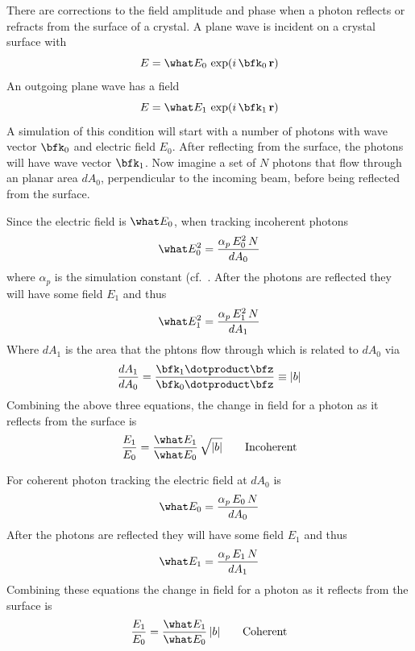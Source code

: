 There are corrections to the field amplitude and phase when a photon reflects or refracts from the
surface of a crystal. A plane wave is incident on a crystal surface with
\begin{equation}
  E = \what E_0 \, \exp(i \, \bfk_0 \, \bfr)
\end{equation}
An outgoing plane wave has a field
\begin{equation}
  E = \what E_1 \, \exp(i \, \bfk_1 \, \bfr)
\end{equation}
A simulation of this condition will start with a number of photons with wave vector $\bfk_0$ and
electric field $E_0$. After reflecting from the surface, the photons will have wave vector
$\bfk_1$. Now imagine a set of $N$ photons that flow through an planar area $dA_0$, perpendicular to
the incoming beam, before being reflected from the surface.

Since the electric field is $\what E_0$, when tracking incoherent photons
\begin{equation}
  \what E_0^2 = \frac{\alpha_p \, E_0^2 \, N}{dA_0}
\end{equation}
where $\alpha_p$ is the simulation constant (cf.~. 
After the photons are reflected they will have some field $E_1$ and thus
\begin{equation}
  \what E_1^2 = \frac{\alpha_p \, E_1^2 \, N}{dA_1}
\end{equation}
Where $dA_1$ is the area that the phtons flow through which is related
to $dA_0$ via
\begin{equation}
  \frac{dA_1}{dA_0} = \frac{\bfk_1 \dotproduct \bfz}{\bfk_0 \dotproduct \bfz} \equiv |b|
\end{equation}
Combining the above three equations, the change in field for a photon
as it reflects from the surface is
\begin{equation}
  \frac{E_1}{E_0} = \frac{\what E_1}{\what E_0} \, \sqrt{|b|} 
  \qquad \text{Incoherent}
\end{equation}

For coherent photon tracking the electric field at $dA_0$ is
\begin{equation}
  \what E_0 = \frac{\alpha_p \, E_0 \, N}{dA_0}
\end{equation}
After the photons are reflected they will have some field $E_1$ and thus
\begin{equation}
  \what E_1 = \frac{\alpha_p \, E_1 \, N}{dA_1}
\end{equation}
Combining these equations the change in field for a photon
as it reflects from the surface is
\begin{equation}
  \frac{E_1}{E_0} = \frac{\what E_1}{\what E_0} \, |b| 
  \qquad \text{Coherent}
\end{equation}

